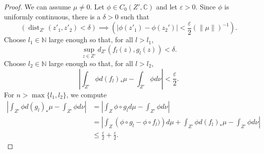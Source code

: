 \documentclass[reqno,11pt, twoside]{amsart}
\theoremstyle{plain}
\theoremstyle{definition}
\theoremstyle{definition}
\theoremstyle{remark}
\numberwithin{equation}{section}
\newcommand{\dist}{\operatorname{dist}}
\newcommand{\Co}{{\mathbb{C}}}
\newcommand{\N}{{\mathbb{N}}}
\newcommand{\ignore}[1]{{}}
\begin{document}
\begin{proof}
We can assume $\mu \neq 0$. Let $\phi \in C_0(Z', \Co)$ 
\ignore{be  compactly-supported} 
and let $\varepsilon>0$. 
Since $\phi$ is uniformly continuous, there is a $\delta>0$ such that
\begin{equation*}
    \left(\dist_{Z'}(z'_1,z'_2) < \delta\right) \implies \left( \left|\phi(z'_1) - \phi(z_2')\right| < \frac{\varepsilon}{2} \left( \|\mu\|\right)^{-1} \right).
\end{equation*}
Choose $l_1\in \N$ large enough so that, for all $l > l_1$,
\begin{equation*}
    \sup_{z \in Z'} d_{Z'}(f_l(z), g_l(z)) < \delta.
\end{equation*}
Choose $l_2 \in \N$ large enough so that, for all $l > l_2$,
\begin{equation*}
    \left|\int_{Z'} \phi d (f_l)_* \mu  - \int_{Z'} \phi d\nu \right| < \frac{\varepsilon}{2}.
\end{equation*}
For $n> \max\{l_1, l_2\}$, we compute
\begin{equation*}
    \begin{split}
        \left|\int_{Z'} \phi d(g_l)_* \mu - \int_{Z'} \phi d\nu  \right| 
        &= \left| \int_{Z} \phi\circ g_l d\mu - \int_{Z'} \phi d\nu\right|
        \\
        &= \left|\int_{Z} \left(\phi \circ g_l - \phi \circ f_l)\right)d\mu + \int_{Z'} \phi d(f_l)_*\mu - \int_{Z'} \phi d\nu \right| \\
        &\leq \frac{\varepsilon}{2} + \frac{\varepsilon}{2}.
    \end{split}
\end{equation*}
\ignore{
Now, if $\psi \in C_0(Z',\Co)$ is arbitrary and $\varepsilon>0$, choose $\phi \in C_0(Z',\Co)$ which is compactly supported and satisfies 
\begin{equation}\label{eq: total variation estimate}
    \sup_{z' \in Z'} |\phi(z') - \psi(z')| < \frac{\varepsilon}{3} \max \left\lbrace \|\mu\|^{-1},  \|\nu\|^{-1}  \right\rbrace.
\end{equation}
If $\nu = 0$, we take the right hand side of \eqref{eq: total variation estimate} as $(\varepsilon \|\mu\|^{-1})/3$.
For $l\in \N$, we compute
\begin{multline*}
    \left| \int_{Z'} \psi d(g_l)_*\mu - \int_{Z'} \psi d\nu \right|
        \\
        =\left|\int_{Z} \left(\psi \circ g_l - \phi \circ g_l \right) d\mu\right| + \left|\int_{Z'} \phi d(g_l)_*\mu - \int_{Z'} \phi d\nu \right|  + \left|\int_{Z'}(\phi - \psi)d\nu \right|.
\end{multline*} 
The first part of the argument ensures that the middle term is less than $\varepsilon/3$ for all sufficiently large $n$. The terms on either are can be estimated using \eqref{eq: total variation estimate} and so we are done.
}
\end{proof}
\end{document}
